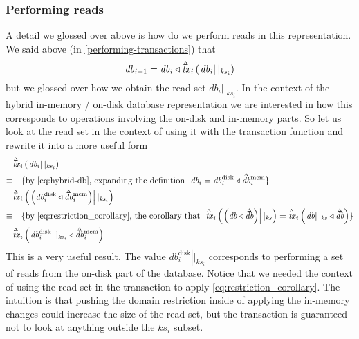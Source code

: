 \documentclass[11pt,a4paper]{article}
\newcommand\restrict[2]{\left.#1\right||_{#2}}
\newcommand\deltavar[1]{\accentset{\Delta}{#1}}
\begin{document}
\subsubsection{Performing reads}

A detail we glossed over above is how do we perform reads in this
representation. We said above (in \cref{performing-transactions}) that
\[
\mathit{db}_{i+1} = \mathit{db}_i \triangleleft \deltavar{\mathit{tx}}_i\left(\restrict{\mathit{db}_i}{\mathit{ks}_i}\right)
\]
but we glossed over how we obtain the read set
$\restrict{\mathit{db}_i}{\mathit{ks}_i}$. In the context of the hybrid
in-memory / on-disk database representation we are interested in how this
corresponds to operations involving the on-disk and in-memory parts. So let us
look at the read set in the context of using it with the transaction function
and rewrite it into a more useful form
\begin{align*}
       & \deltavar{\mathit{tx}}_i\left(\restrict{\mathit{db}_i}{\mathit{ks}_i}\right)
\\
\equiv & \quad \text{\{by \cref{eq:hybrid-db}, expanding the definition ~$\mathit{db}_i = \mathit{db}^{\mathrm{disk}}_i \triangleleft \deltavar{\mathit{db}}^{\mathrm{mem}}_i$\}}
\\
       & \deltavar{\mathit{tx}}_i\left(\restrict{\left(\mathit{db}^{\mathrm{disk}}_i \triangleleft \deltavar{\mathit{db}}^{\mathrm{mem}}_i\right)}{\mathit{ks}_i}\right)
\\
\equiv & \quad \text{\{by \cref{eq:restriction_corollary}, the corollary that ~$\deltavar{\mathit{tx}}_i\left(\restrict{\left(\mathit{db} \triangleleft \deltavar{\mathit{db}}\right)}{\mathit{ks}}\right)
=
  \deltavar{\mathit{tx}}_i\left(\restrict{\mathit{db}}{\mathit{ks}} \triangleleft \deltavar{\mathit{db}}\right)$\}}
\\
       & \deltavar{\mathit{tx}}_i\left(\restrict{\mathit{db}^{\mathrm{disk}}_i}{\mathit{ks}_i} \triangleleft \deltavar{\mathit{db}}^{\mathrm{mem}}_i\right)
\end{align*}
This is a very useful result. The value $\restrict{\mathit{db}^{\mathrm{disk}}_i}{\mathit{ks}_i}$
corresponds to performing a set of reads from the on-disk part of the database.
Notice that we needed the context of using the read set in the transaction to
apply \cref{eq:restriction_corollary}. The intuition is that pushing the
domain restriction inside of applying the in-memory changes could increase the
size of the read set, but the transaction is guaranteed not to look at anything
outside the $\mathit{ks}_i$ subset.
\end{document}

